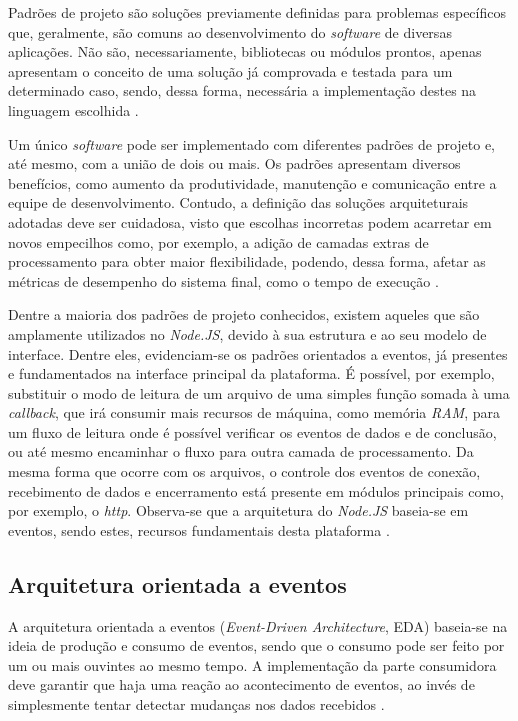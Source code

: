 \documentclass[12pt]{article}
\begin{document}
Padrões de projeto são soluções previamente definidas para problemas específicos que, geralmente,
são comuns ao desenvolvimento do \textit{software} de diversas aplicações. Não são, necessariamente, 
bibliotecas ou módulos prontos, apenas apresentam o conceito de uma solução já comprovada e testada para um 
determinado caso, sendo, dessa forma, necessária a implementação destes na 
linguagem escolhida \cite[p. 13]{DIOGORESENDE}.

Um único \textit{software} pode ser implementado com diferentes padrões de projeto e, até mesmo, com a união
de dois ou mais. Os padrões apresentam diversos benefícios, como aumento da produtividade, manutenção e comunicação
entre a equipe de desenvolvimento. Contudo, a definição das soluções arquiteturais adotadas deve ser 
cuidadosa, visto que escolhas incorretas podem acarretar em novos empecilhos como, por exemplo, a adição de
camadas extras de processamento para obter maior flexibilidade, podendo, dessa forma, 
afetar as métricas de desempenho do sistema final, como o tempo de execução \cite[p. 13 - p. 14]{DIOGORESENDE}.

Dentre a maioria dos padrões de projeto conhecidos, existem aqueles que são amplamente utilizados no 
\textit{Node.JS}, devido à sua estrutura e ao seu modelo de interface. Dentre eles, evidenciam-se
os padrões orientados a eventos, já presentes e fundamentados na interface principal 
da plataforma. É possível, por exemplo, substituir o modo de leitura de um arquivo de 
uma simples função somada à uma \textit{callback}, que irá consumir mais recursos de máquina, como memória \textit{RAM}, 
para um fluxo de leitura onde é possível verificar os eventos de dados e de conclusão, 
ou até mesmo encaminhar o fluxo para outra camada de processamento. Da mesma forma que ocorre com os 
arquivos, o controle dos eventos 
de conexão, recebimento de dados e encerramento está presente em módulos principais como, por exemplo, 
o \textit{http}. Observa-se que a arquitetura do \textit{Node.JS} baseia-se em eventos, sendo estes,
recursos fundamentais desta plataforma \cite[p. 15]{DIOGORESENDE}.


\subsection{Arquitetura orientada a eventos}

A arquitetura orientada a eventos (\textit{Event-Driven Architecture}, EDA) baseia-se na ideia de produção e consumo 
de eventos, sendo que o consumo pode ser feito por um ou mais ouvintes ao mesmo tempo. A implementação da parte consumidora 
deve garantir que haja uma reação ao acontecimento de eventos, ao invés de simplesmente tentar detectar 
mudanças nos dados recebidos \cite[p. 27]{DIOGORESENDE}.
\end{document}
